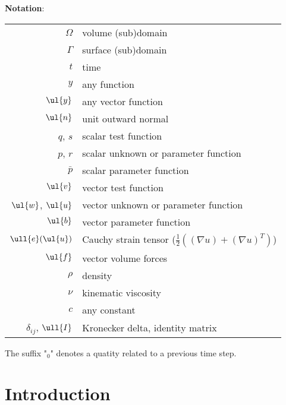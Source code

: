 \textbf{Notation}:

\begin{center}
  \begin{tabular}{rl}
    $\Omega$ & volume (sub)domain \\
    $\Gamma$ & surface (sub)domain \\
    $t$ & time \\
    $y$ & any function \\
    $\ul{y}$ & any vector function \\
    $\ul{n}$ & unit outward normal \\
    $q$, $s$ & scalar test function \\
    $p$, $r$ & scalar unknown or parameter function \\
    $\bar{p}$ & scalar parameter function \\
    $\ul{v}$ & vector test function \\
    $\ul{w}$, $\ul{u}$ & vector unknown or parameter function \\
    $\ul{b}$ & vector parameter function \\
    $\ull{e}(\ul{u})$ & Cauchy strain tensor ($\frac{1}{2}((\nabla u) + (\nabla
    u)^T)$) \\
    $\ul{f}$ & vector volume forces \\
    $\rho$ & density \\
    $\nu$ & kinematic viscosity \\
    $c$ & any constant \\
    $\delta_{ij}$, $\ull{I}$ & Kronecker delta, identity matrix \\
  \end{tabular}
\end{center}

The suffix "$_0$" denotes a quatity related to a previous time step.

\section{Introduction}

